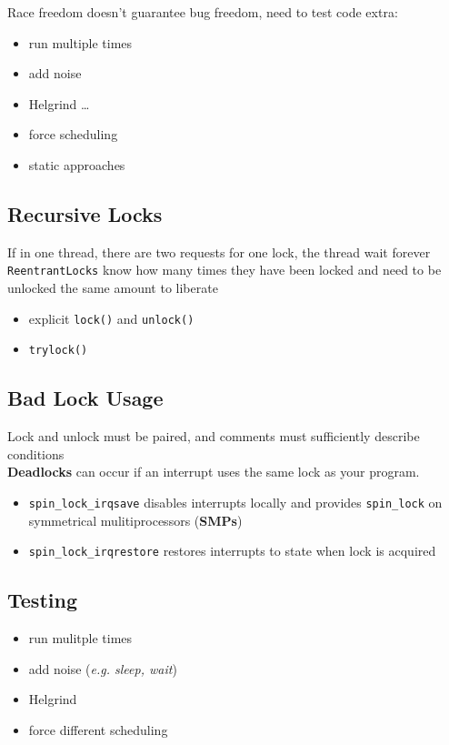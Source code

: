 \documentclass[]{article}
\theoremstyle{definition}
\begin{document}
			Race freedom doesn't guarantee bug freedom, need to test code extra:
			\begin{itemize}
				\item run multiple times
				\item add noise
				\item Helgrind \ldots
				\item force scheduling
				\item static approaches
			\end{itemize}
		\subsection{Recursive Locks}
			If in one thread, there are two requests for one lock, the thread wait forever \\
			\lstinline|ReentrantLocks| know how many times they have been locked and need to be unlocked the same amount to liberate
			\begin{itemize}
				\item explicit \lstinline|lock()| and \lstinline|unlock()|
				\item \lstinline|trylock()|
			\end{itemize}
		\subsection{Bad Lock Usage}
			Lock and unlock must be paired, and comments must sufficiently describe conditions \\
			\textbf{Deadlocks} can occur if an interrupt uses the same lock as your program. 
			\begin{itemize}
				\item \lstinline|spin_lock_irqsave| disables interrupts locally and provides \lstinline|spin_lock| on symmetrical mulitiprocessors (\textbf{SMPs})
				\item \lstinline|spin_lock_irqrestore| restores interrupts to state when lock is acquired
			\end{itemize}
		\subsection{Testing}
			\begin{itemize}
				\item run mulitple times
				\item add noise (\textit{e.g. sleep, wait})
				\item Helgrind
				\item force different scheduling
			\end{itemize}
\end{document}
